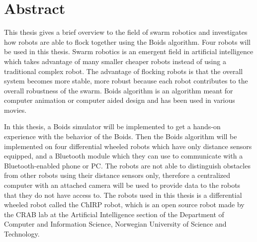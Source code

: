 \section*{Abstract}
\label{sec:abstract}

This thesis gives a brief overview to the field of swarm robotics and investigates how robots are able to flock together using the Boids algorithm. Four robots will be used in this thesis. Swarm robotics is an emergent field in artificial intelligence which takes advantage of many smaller cheaper robots instead of using a traditional complex robot. The advantage of flocking robots is that the overall system becomes more stable, more robust because each robot contributes to the overall robustness of the swarm. Boids algorithm is an algorithm meant for computer animation or computer aided design and has been used in various movies.

In this thesis, a Boids simulator will be implemented to get a hands-on experience with the behavior of the Boids. Then the Boids algorithm will be implemented on four differential wheeled robots which have only distance sensors equipped, and a Bluetooth module which they can use to communicate with a Bluetooth-enabled phone or PC. The robots are not able to distinguish obstacles from other robots using their distance sensors only, therefore a centralized computer with an attached camera will be used to provide data to the robots that they do not have access to.
The robots used in this thesis is a differential wheeled robot called the ChIRP robot, which is an open source robot made by the CRAB lab at the Artificial Intelligence section of the Department of Computer and Information Science, Norwegian University of Science and Technology.


%
%

